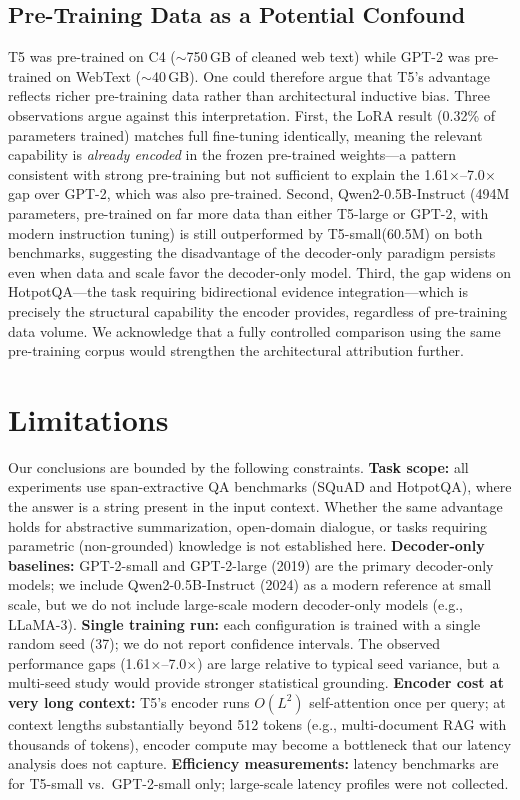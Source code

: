 \documentclass[11pt]{article}
\newcommand{\tssmall}{T5-small\xspace}
\newcommand{\qwensmall}{Qwen2-0.5B\xspace}
\newcommand{\squad}{SQuAD\xspace}
\newcommand{\hotpotqa}{HotpotQA\xspace}
\begin{document}
\subsection{Pre-Training Data as a Potential Confound}

T5 was pre-trained on C4 ($\sim$750\,GB of cleaned web text) while GPT-2 was
pre-trained on WebText ($\sim$40\,GB).
One could therefore argue that T5's advantage reflects richer pre-training data
rather than architectural inductive bias.
Three observations argue against this interpretation.
First, the LoRA result (0.32\% of parameters trained) matches full fine-tuning
identically, meaning the relevant capability is \emph{already encoded} in the
frozen pre-trained weights---a pattern consistent with strong pre-training but
not sufficient to explain the 1.61$\times$--7.0$\times$ gap over GPT-2, which was
also pre-trained.
Second, \qwensmall-Instruct (494M parameters, pre-trained on far more data than
either T5-large or GPT-2, with modern instruction tuning) is still outperformed
by \tssmall (60.5M) on both benchmarks, suggesting the disadvantage of the
decoder-only paradigm persists even when data and scale favor the decoder-only model.
Third, the gap widens on \hotpotqa---the task requiring bidirectional evidence
integration---which is precisely the structural capability the encoder provides,
regardless of pre-training data volume.
We acknowledge that a fully controlled comparison using the same pre-training
corpus would strengthen the architectural attribution further.

\section{Limitations}

Our conclusions are bounded by the following constraints.
\textbf{Task scope:} all experiments use span-extractive QA benchmarks (\squad
and \hotpotqa), where the answer is a string present in the input context.
Whether the same advantage holds for abstractive summarization, open-domain
dialogue, or tasks requiring parametric (non-grounded) knowledge is not
established here.
\textbf{Decoder-only baselines:} GPT-2-small and GPT-2-large (2019) are
the primary decoder-only models; we include \qwensmall-Instruct (2024) as a
modern reference at small scale, but we do not include large-scale modern
decoder-only models (e.g., LLaMA-3).
\textbf{Single training run:} each configuration is trained with a single random
seed (37); we do not report confidence intervals.
The observed performance gaps (1.61$\times$--7.0$\times$) are large relative to
typical seed variance, but a multi-seed study would provide stronger statistical
grounding.
\textbf{Encoder cost at very long context:} T5's encoder runs $O(L^2)$
self-attention once per query; at context lengths substantially beyond 512 tokens
(e.g., multi-document RAG with thousands of tokens), encoder compute may become
a bottleneck that our latency analysis does not capture.
\textbf{Efficiency measurements:} latency benchmarks are for T5-small vs.\
GPT-2-small only; large-scale latency profiles were not collected.
\end{document}
